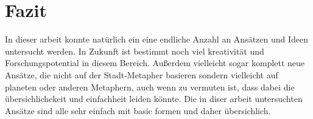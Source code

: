 \section{Fazit} \label{sec:Fazit}
In dieser arbeit konnte natürlich ein eine endliche Anzahl an Ansätzen und Ideen untersucht werden. In Zukunft ist bestimmt noch viel kreativität und Forschungspotential in diesem Bereich. Außerdem vielleicht sogar komplett neue Ansätze, die nicht auf der Stadt-Metapher basieren sondern vielleicht auf planeten oder anderen Metaphern, auch wenn zu vermuten ist, dass dabei die übersichlichekeit und einfachheit leiden könnte. Die in diser arbeit untersuchten Ansätze sind alle sehr einfach mit basic formen und daher übersichlich.